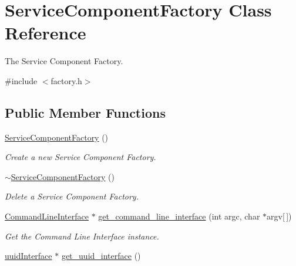 \hypertarget{classServiceComponentFactory}{\section{Service\-Component\-Factory Class Reference}
\label{classServiceComponentFactory}
}


The Service Component Factory.  




{\ttfamily \#include $<$factory.\-h$>$}

\subsection*{Public Member Functions}
\begin{DoxyCompactItemize}
\item 
\hypertarget{classServiceComponentFactory_a0d91931c88bb8df41ee4f58b54c3cc8f}{\hyperlink{classServiceComponentFactory_a0d91931c88bb8df41ee4f58b54c3cc8f}{Service\-Component\-Factory} ()}\label{classServiceComponentFactory_a0d91931c88bb8df41ee4f58b54c3cc8f}

\begin{DoxyCompactList}\small\item\em Create a new Service Component Factory. \end{DoxyCompactList}\item 
\hypertarget{classServiceComponentFactory_a377472acb3040b7e06749ff48239ebd4}{\hyperlink{classServiceComponentFactory_a377472acb3040b7e06749ff48239ebd4}{$\sim$\-Service\-Component\-Factory} ()}\label{classServiceComponentFactory_a377472acb3040b7e06749ff48239ebd4}

\begin{DoxyCompactList}\small\item\em Delete a Service Component Factory. \end{DoxyCompactList}\item 
\hypertarget{classServiceComponentFactory_a7783b94ad65b0be4de8e4658f5b0ab4f}{\hyperlink{classCommandLineInterface}{Command\-Line\-Interface} $\ast$ \hyperlink{classServiceComponentFactory_a7783b94ad65b0be4de8e4658f5b0ab4f}{get\-\_\-command\-\_\-line\-\_\-interface} (int argc, char $\ast$argv\mbox{[}$\,$\mbox{]})}\label{classServiceComponentFactory_a7783b94ad65b0be4de8e4658f5b0ab4f}

\begin{DoxyCompactList}\small\item\em Get the Command Line Interface instance. \end{DoxyCompactList}\item 
\hypertarget{classServiceComponentFactory_a3c7d8ab1a2a2a88eac293d5a10610829}{\hyperlink{classuuidInterface}{uuid\-Interface} $\ast$ \hyperlink{classServiceComponentFactory_a3c7d8ab1a2a2a88eac293d5a10610829}{get\-\_\-uuid\-\_\-interface} ()}\label{classServiceComponentFactory_a3c7d8ab1a2a2a88eac293d5a10610829}


\end{DoxyCompactItemize}
